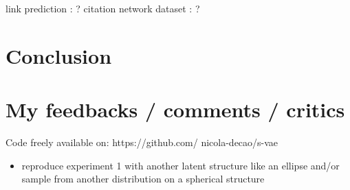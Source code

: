 \documentclass[12pt]{article}
\begin{document}
link prediction : ?
citation network dataset : ?


\section{Conclusion}

\section{My feedbacks / comments / critics}

Code freely available on: https://github.com/ nicola-decao/s-vae

\begin{itemize}
    \item reproduce experiment 1 with another latent structure like an ellipse and/or sample from another distribution on a spherical structure
\end{itemize}
\end{document}

